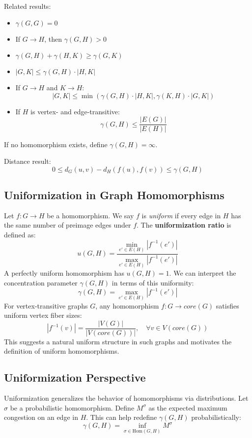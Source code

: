 \documentclass[11pt]{article}
\begin{document}
Related results:
\begin{itemize}
  \item $\gamma(G,G) = 0$
  \item If $G \rightarrow H$, then $\gamma(G,H) > 0$
  \item $\gamma(G, H) + \gamma(H,K) \geq \gamma(G,K)$
  \item $|G,K| \leq \gamma(G,H) \cdot |H,K|$
  \item If $G \rightarrow H$ and $K \rightarrow H$: 
  $$|G,K| \leq \min(\gamma(G,H)\cdot|H,K|, \gamma(K,H)\cdot|G,K|)$$
  \item If $H$ is vertex- and edge-transitive: 
  $$\gamma(G,H) \leq \frac{|E(G)|}{|E(H)|}$$
\end{itemize}

If no homomorphism exists, define $\gamma(G,H)=\infty$.

Distance result:
$$0 \leq d_G(u,v) - d_H(f(u), f(v)) \leq \gamma(G,H)$$


\subsection*{Uniformization in Graph Homomorphisms}
Let $f : G \rightarrow H$ be a homomorphism. We say $f$ is \emph{uniform} if every edge in $H$ has the same number of preimage edges under $f$. The \textbf{uniformization ratio} is defined as:
\[
u(G,H) = \frac{\min_{e' \in E(H)} |f^{-1}(e')|}{\max_{e' \in E(H)} |f^{-1}(e')|}
\]
A perfectly uniform homomorphism has $u(G,H)=1$. We can interpret the concentration parameter $\gamma(G,H)$ in terms of this uniformity:
\[
\gamma(G,H) = \max_{e' \in E(H)} |f^{-1}(e')|
\]
For vertex-transitive graphs $G$, any homomorphism $f : G \rightarrow core(G)$ satisfies uniform vertex fiber sizes:
\[
|f^{-1}(v)| = \frac{|V(G)|}{|V(core(G))|}, \quad \forall v \in V(core(G))
\]
This suggests a natural uniform structure in such graphs and motivates the definition of uniform homomorphisms.

\subsection{Uniformization Perspective}
Uniformization generalizes the behavior of homomorphisms via distributions. Let $\sigma$ be a probabilistic homomorphism. Define $M^\sigma$ as the expected maximum congestion on an edge in $H$. This can help redefine $\gamma(G,H)$ probabilistically:
$$\gamma(G,H) = \inf_{\sigma \in \text{Hom}(G,H)} M^\sigma$$
\end{document}
